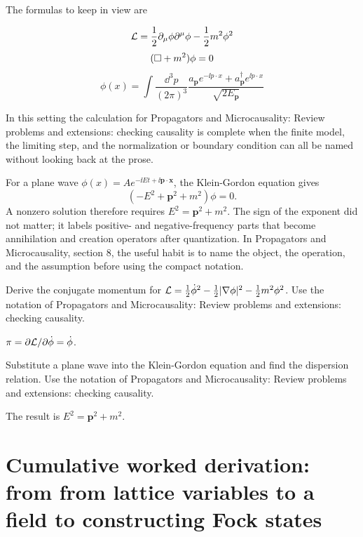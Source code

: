 The formulas to keep in view are

\[
  \mathcal L=\frac12\partial_\mu\phi\partial^\mu\phi-\frac12m^2\phi^2
\]
\[
  (\Box+m^2)\phi=0
\]
\[
  \phi(x)=\int\frac{\dd^3p}{(2\pi)^3}\frac{a_{\bm p}e^{-\ii p\cdot x}+a_{\bm p}^\dagger e^{\ii p\cdot x}}{\sqrt{2E_{\bm p}}}
\]

In this setting the calculation for Propagators and Microcausality: Review problems and extensions: checking causality is complete when the finite model, the limiting step, and the normalization or boundary condition can all be named without looking back at the prose.




\begin{example}
For a plane wave \(\phi(x)=Ae^{-\ii Et+\ii\bm p\cdot\bm x}\), the Klein-Gordon equation gives
\[
  (-E^2+\bm p^2+m^2)\phi=0.
\]
A nonzero solution therefore requires \(E^2=\bm p^2+m^2\).  The sign of the exponent did not matter; it labels positive- and negative-frequency parts that become annihilation and creation operators after quantization.  In Propagators and Microcausality, section 8, the useful habit is to name the object, the operation, and the assumption before using the compact notation.
\end{example}



\begin{exercise}
Derive the conjugate momentum for \(\mathcal L=\frac12\dot\phi^2-\frac12|\nabla\phi|^2-\frac12m^2\phi^2\).  Use the notation of Propagators and Microcausality: Review problems and extensions: checking causality.
\begin{answer}
\(\pi=\partial\mathcal L/\partial\dot\phi=\dot\phi\).
\end{answer}
\end{exercise}

\begin{exercise}
Substitute a plane wave into the Klein-Gordon equation and find the dispersion relation.  Use the notation of Propagators and Microcausality: Review problems and extensions: checking causality.
\begin{answer}
The result is \(E^2=\bm p^2+m^2\).
\end{answer}
\end{exercise}



\section{Cumulative worked derivation: from from lattice variables to a field to constructing Fock states}


